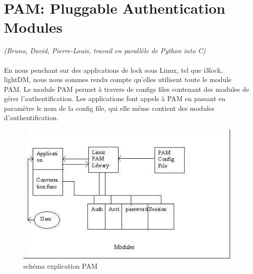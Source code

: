 \documentclass{article}
\begin{document}
  \section{PAM: Pluggable Authentication Modules} \emph{(Bruno, David,
  Pierre-Louis, travail en parallèle de Python into C)}\\ \\
En nous penchant sur des applications de lock sous Linux, tel que i3lock,
lightDM, nous nous sommes rendu compte qu’elles utilisent toute le module
PAM.
Le module PAM permet à travers de configs files contenant des modules de
gérer l’authentification. Les applications font appels à PAM en passant en
paramètre le nom de la config file, qui elle même contient des modules
d’authentification.

  \begin{figure}[h]
    \begin{center}
    \includegraphics[width=0.8\linewidth]{./pam}
    \caption{schéma explication PAM}
  \end{center}
  \end{figure}
\end{document}
